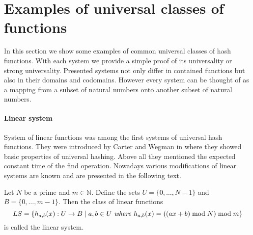 \section{Examples of universal classes of functions}
In this section we show some examples of common universal classes of hash functions. With each system we provide a simple proof of its universality or strong universality. Presented systems not only differ in contained functions but also in their domains and codomains. However every system can be thought of as a mapping from a subset of natural numbers onto another subset of natural numbers.

\paragraph{Linear system}
System of linear functions was among the first systems of universal hash functions. They were introduced by Carter and Wegman in \cite{DBLP:journals/jcss/CarterW79} where they showed basic properties of universal hashing. Above all they mentioned the expected constant time of the find operation. Nowadays various modifications of linear systems are known and are presented in the following text. 

\begin{definition}
Let $N$ be a prime and $m \in \mathbb{N}$. Define the sets $U = \{0, \dots, N - 1 \}$ and $B = \{0, \dots, m - 1\}$. Then the class of linear functions 
\[ LS = \{h_{a, b}(x): U \rightarrow B \mid a, b \in U \textit{ where } h_{a, b}(x) = ((ax + b) \bmod N) \bmod m \} \]
is called the linear system.
\end{definition}

